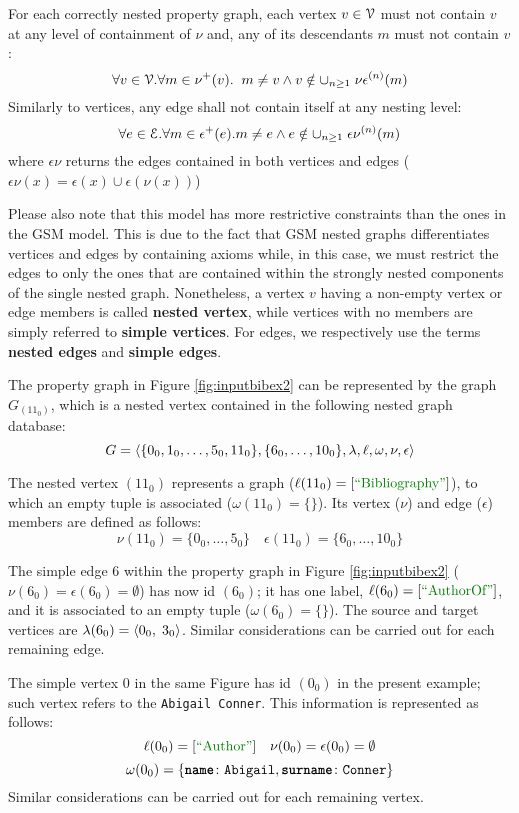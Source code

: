 \begin{axiom}
	For each correctly nested property graph, each vertex $v\in \mathcal{V}$ must not contain $v$ at any level of containment of $\nu$ and, any of its descendants $m$ must not contain $v$:
	\[\forall v\in \mathcal{V}. \forall m\in \nu^+(v).\;\; m\neq v\wedge v\notin \cup_{n\geq 1}\;{\nu\epsilon}^{(n)}(m)\]
	Similarly to vertices, any edge shall not contain itself at any nesting level:
	\[\forall e\in \mathcal{E}. \forall m\in \epsilon^+(e). m\neq e\wedge e\notin \cup_{n\geq 1}\;{\epsilon\nu}^{(n)}(m)\]
	where ${\epsilon\nu}$ returns the edges contained in both vertices and edges ($\epsilon\nu(x)=\epsilon(x)\cup \epsilon(\nu(x))$)
\end{axiom}

Please also note that this model has more restrictive constraints than the ones in the GSM model. This is due to the fact that GSM nested graphs differentiates vertices and edges by containing axioms while, in this case, we must restrict the edges to only the ones that are contained within the strongly nested components of the single nested graph. Nonetheless, a vertex $v$ having a non-empty vertex or edge members is called \textbf{nested vertex}, while vertices with no members are simply referred to \textbf{simple vertices}. For edges, we respectively use the terms \textbf{nested edges} and \textbf{simple edges}. 

\begin{example}[label=exImpl]
	The property graph in Figure \ref{fig:inputbibex2} can be represented by the graph $G_{({{11}_0})}$, which is a nested vertex contained in the following nested graph database:
	\[G=\Braket{\{0_0,1_0,\dots,5_0,11_0\}, \{6_0,\dots, 10_0\},\lambda,\ell,\omega,\nu,\epsilon}\]
	
	The nested vertex $({{11}_0})$  represents a  graph ($\ell({{11}_0})=[\mstr{Bibliography}]$), to which an empty tuple is associated ($\omega({{11}_0})=\{\}$). Its vertex ($\nu$) and edge ($\epsilon$) members are defined as follows:
	\[\nu({{11}_0})=\{{{0}_0},\dots,{{5}_0}\}\quad\epsilon({{11}_0})=\{{{6}_0},\dots,{{10}_0}\}\]
	
	The simple edge $6$ within the property graph in Figure \ref{fig:inputbibex2} ($\nu({{6}_0})=\epsilon({{6}_0})=\emptyset$) has now id $({{6}_0})$; it has one label, $\ell({{6}_0})=[\mstr{AuthorOf}]$, and it is associated to an empty tuple ($\omega({{6}_0})=\{\}$).
	The source and target vertices are 
	$\lambda({{6}_0})=\Braket{{{0}_0},\;3_0}$. Similar considerations can be carried out for each  remaining edge.
	
	The simple vertex $0$ in the same Figure has id $({{0}_0})$ in the present example; such vertex refers to the  \texttt{Abigail Conner}. This information is represented as follows:
	\[\ell({{0}_0})=[\mstr{Author}]\quad\nu({{0}_0})=\epsilon({{0}_0})=\emptyset\] \[\omega({{0}_0})=\{\texttt{\textbf{name}}\colon\texttt{Abigail},\texttt{\textbf{surname}}\colon\texttt{Conner}\}\]
	Similar considerations can be carried out for each remaining vertex.
	
\end{example}


